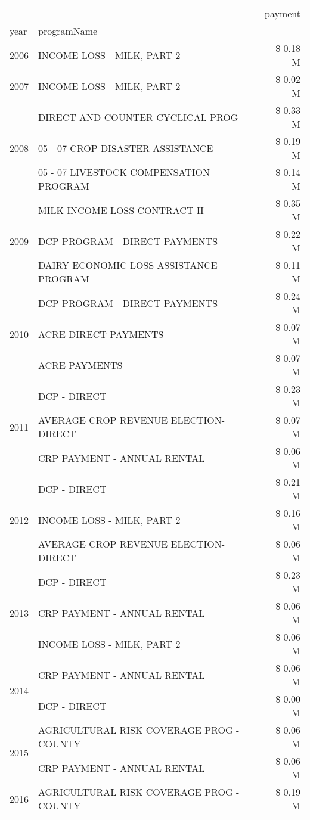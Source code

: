 \begin{tabular}{llr}
\toprule
 &  & payment \\
year & programName &  \\
\midrule
2006 & INCOME LOSS - MILK, PART 2 & \$ 0.18 M \\
\cline{1-3}
2007 & INCOME LOSS - MILK, PART 2 & \$ 0.02 M \\
\cline{1-3}
\multirow[t]{3}{*}{2008} & DIRECT AND COUNTER CYCLICAL PROG & \$ 0.33 M \\
 & 05 - 07 CROP DISASTER ASSISTANCE & \$ 0.19 M \\
 & 05 - 07 LIVESTOCK COMPENSATION PROGRAM & \$ 0.14 M \\
\cline{1-3}
\multirow[t]{3}{*}{2009} & MILK INCOME LOSS CONTRACT II & \$ 0.35 M \\
 & DCP PROGRAM - DIRECT PAYMENTS & \$ 0.22 M \\
 & DAIRY ECONOMIC LOSS ASSISTANCE PROGRAM & \$ 0.11 M \\
\cline{1-3}
\multirow[t]{3}{*}{2010} & DCP PROGRAM - DIRECT PAYMENTS & \$ 0.24 M \\
 & ACRE DIRECT PAYMENTS & \$ 0.07 M \\
 & ACRE PAYMENTS & \$ 0.07 M \\
\cline{1-3}
\multirow[t]{3}{*}{2011} & DCP - DIRECT & \$ 0.23 M \\
 & AVERAGE CROP REVENUE ELECTION-DIRECT & \$ 0.07 M \\
 & CRP PAYMENT - ANNUAL RENTAL & \$ 0.06 M \\
\cline{1-3}
\multirow[t]{3}{*}{2012} & DCP - DIRECT & \$ 0.21 M \\
 & INCOME LOSS - MILK, PART 2 & \$ 0.16 M \\
 & AVERAGE CROP REVENUE ELECTION-DIRECT & \$ 0.06 M \\
\cline{1-3}
\multirow[t]{3}{*}{2013} & DCP - DIRECT & \$ 0.23 M \\
 & CRP PAYMENT - ANNUAL RENTAL & \$ 0.06 M \\
 & INCOME LOSS - MILK, PART 2 & \$ 0.06 M \\
\cline{1-3}
\multirow[t]{2}{*}{2014} & CRP PAYMENT - ANNUAL RENTAL & \$ 0.06 M \\
 & DCP - DIRECT & \$ 0.00 M \\
\cline{1-3}
\multirow[t]{2}{*}{2015} & AGRICULTURAL RISK COVERAGE PROG - COUNTY & \$ 0.06 M \\
 & CRP PAYMENT - ANNUAL RENTAL & \$ 0.06 M \\
\cline{1-3}
\multirow[t]{3}{*}{2016} & AGRICULTURAL RISK COVERAGE PROG - COUNTY & \$ 0.19 M \\

\end{tabular}
